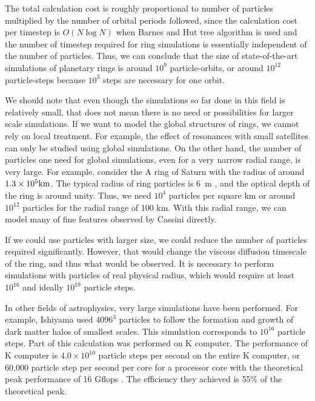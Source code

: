 \documentclass[Afour,sageh,times]{sagej}
\newcommand{\rev}[1]{{#1}}
\begin{document}
The total calculation cost is roughly proportional to number of
particles multiplied by the number of orbital periods followed, since
the calculation cost per timestep is $O(N \log N)$ when Barnes and Hut
tree algorithm is used and the number of timestep required for ring
simulations is essentially independent of the number of
particles. Thus, we can conclude that the size of state-of-the-art
simulations of planetary rings is around $10^9$ particle-orbits, or
around $10^{12}$ particle-steps \rev{because $10^3$ steps are
  necessary for one orbit}.

We should note that even though the simulations so far done in this
field is relatively small, that does not mean there is no need or
possibilities for larger scale simulations. If we want to model the
global structures of rings, we cannot rely on local treatment. For
example, the effect of resonances with small satellites can only be
studied using global simulations. On the other hand, the number of
particles one need for global simulations, even for a very narrow
radial range, is very large. For example, consider the A ring of
Saturn with the radius of around $1.3\times 10^5\rm km$. The typical
radius of ring particles is 6~m \citep{ZEBKER1985531}, and the optical
depth of the ring is around unity. Thus, we need $10^4$ particles per
square km or around $10^{12}$ particles for the radial range of 100
km. With this radial range, we can model many of fine features
observed by Cassini directly.

If we could use particles with larger size, we could reduce the number
of particles required significantly. However, that would change the
viscous diffusion timescale of the ring, and thus what would be
observed. It is necessary to perform simulations with particles of
real physical radius, which would require at least $10^{16}$ and
ideally $10^{19}$ particle steps.

In other fields of astrophysics, very large simulations have been
performed. For example, Ishiyama \citep{Ishiyama2014} used $4096^3$
particles to follow the formation and growth of dark matter halos of
smallest scales. This simulation corresponds to $10^{16}$ particle
steps. Part of this calculation was performed on K computer. The
performance of K computer is $4.0\times 10^{10}$ particle steps per
second on the entire K computer, or 60,000 particle step per second
per core for a processor core with the theoretical peak performance of
16 Gflops \citep{Ishiyamaetal2012}. The efficiency they achieved is
55\% of the theoretical peak.
\end{document}
